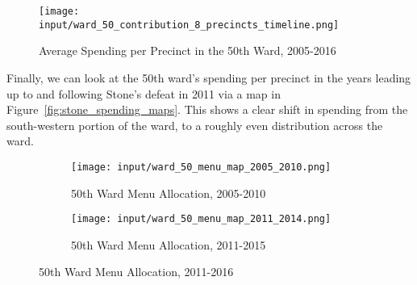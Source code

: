 \begin{figure}[H]
    \centering
    \texttt{[image: input/ward\_50\_contribution\_8\_precincts\_timeline.png]}
    \caption{Average Spending per Precinct in the 50th Ward, 2005-2016}
    \label{fig:stone_spending_timeline}
\end{figure}

Finally, we can look at the 50th ward's spending per precinct in the years leading up to and following Stone's defeat in 2011 via a map in Figure~\ref{fig:stone_spending_maps}.
This shows a clear shift in spending from the south-western portion of the ward, to a roughly even distribution across the ward.

\begin{figure}[H]
    \centering
    \begin{subfigure}[b]{0.45\textwidth} %
    \texttt{[image: input/ward\_50\_menu\_map\_2005\_2010.png]}
    \caption{50th Ward Menu Allocation, 2005-2010}
    \end{subfigure}
    \hfill %
    \begin{subfigure}[b]{0.45\textwidth}
    \texttt{[image: input/ward\_50\_menu\_map\_2011\_2014.png]}
    \caption{50th Ward Menu Allocation, 2011-2015}
    \end{subfigure}
    \caption{50th Ward Menu Allocation, 2011-2016}
    \label{fig:stone_support_maps}
\end{figure}

